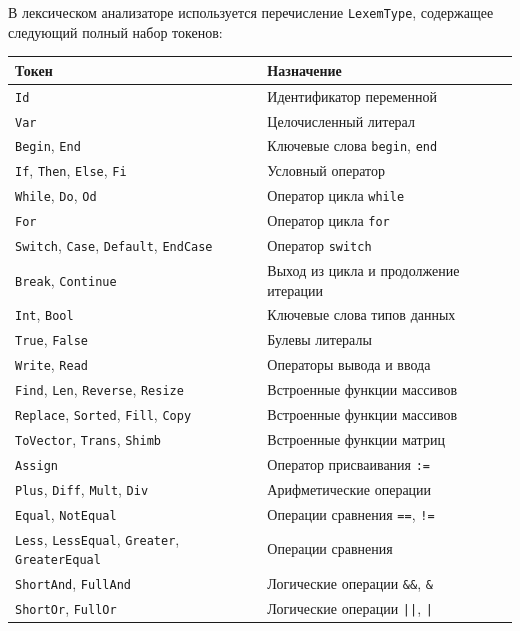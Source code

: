 \documentclass[a4paper,final]{article}
\begin{document}
В лексическом анализаторе используется перечисление \texttt{LexemType},
содержащее следующий полный набор токенов:
\footnotesize{
\begin{center}
\begin{tabular}{ll}
\hline
\textbf{Токен} & \textbf{Назначение} \\
\hline
\texttt{Id}           & Идентификатор переменной \\
\texttt{Var}          & Целочисленный литерал \\
\texttt{Begin}, \texttt{End} & Ключевые слова \texttt{begin}, \texttt{end} \\
\texttt{If}, \texttt{Then}, \texttt{Else}, \texttt{Fi} & Условный оператор \\
\texttt{While}, \texttt{Do}, \texttt{Od} & Оператор цикла \texttt{while} \\
\texttt{For} & Оператор цикла \texttt{for} \\
\texttt{Switch}, \texttt{Case}, \texttt{Default}, \texttt{EndCase} & Оператор \texttt{switch} \\
\texttt{Break}, \texttt{Continue} & Выход из цикла и продолжение итерации \\
\texttt{Int}, \texttt{Bool} & Ключевые слова типов данных \\
\texttt{True}, \texttt{False} & Булевы литералы \\
\texttt{Write}, \texttt{Read} & Операторы вывода и ввода \\
\texttt{Find}, \texttt{Len}, \texttt{Reverse}, \texttt{Resize} & Встроенные функции массивов \\
\texttt{Replace}, \texttt{Sorted}, \texttt{Fill}, \texttt{Copy} & Встроенные функции массивов \\
\texttt{ToVector}, \texttt{Trans}, \texttt{Shimb} & Встроенные функции матриц \\
\texttt{Assign} & Оператор присваивания \texttt{:=} \\
\texttt{Plus}, \texttt{Diff}, \texttt{Mult}, \texttt{Div} & Арифметические операции \\
\texttt{Equal}, \texttt{NotEqual} & Операции сравнения \texttt{==}, \texttt{!=} \\
\texttt{Less}, \texttt{LessEqual}, \texttt{Greater}, \texttt{GreaterEqual} & Операции сравнения \\
\texttt{ShortAnd}, \texttt{FullAnd} & Логические операции \texttt{\&\&}, \texttt{\&} \\
\texttt{ShortOr}, \texttt{FullOr} & Логические операции \texttt{||}, \texttt{|} \\

\end{tabular}
\end{center}}
\end{document}
